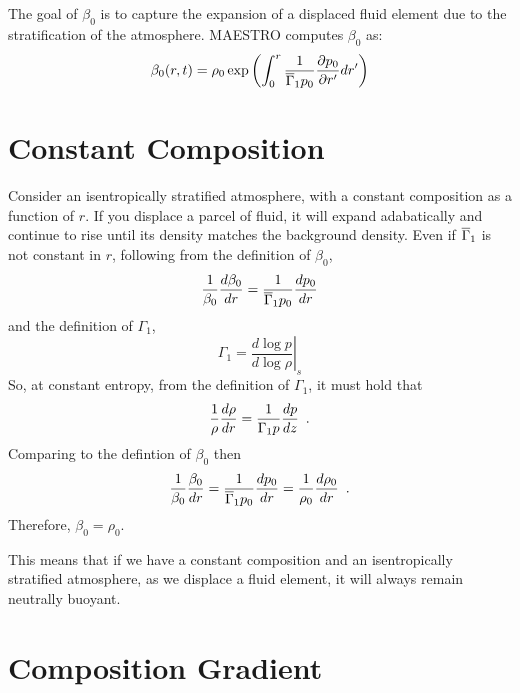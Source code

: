 The goal of $\beta_0$ is to capture the expansion of a displaced fluid
element due to the stratification of the atmosphere.  MAESTRO computes
$\beta_0$ as:
\begin{equation}
\beta_0(r,t) = \rho_0 \exp\left (  \int_0^r  \frac{1}{\overline{\Gamma}_1 p_0} \frac{\partial p_0}{\partial r^\prime} dr^\prime \right )
\end{equation}

\section{Constant Composition}
Consider an isentropically stratified atmosphere, with a constant
composition as a function of $r$.  If you displace a parcel of fluid,
it will expand adabatically and continue to rise until its density
matches the background density.  
Even if $\overline{\Gamma}_1$ is not constant in $r$, following from the
definition of $\beta_0$,
\begin{equation}
\frac{1}{\beta_0} \frac{d\beta_0}{dr} = \frac{1}{\overline{\Gamma}_1 p_0} \frac{dp_0}{dr}
\end{equation}
and the definition of $\Gamma_1$,
\begin{equation}
\Gamma_1 = \left . \frac{d \log p}{d \log \rho} \right |_s
\end{equation}
So, at constant entropy, from the definition of $\Gamma_1$, it must hold
that
\begin{equation}
\frac{1}{\rho} \frac{d \rho}{dr} = \frac{1}{\Gamma_1 p} \frac{d p}{dz} \enskip .
\end{equation}
Comparing to the defintion of $\beta_0$ then
\begin{equation}
\frac{1}{\beta_0} \frac{\beta_0}{dr} =\frac{1}{\overline{\Gamma}_1 p_0}\frac{dp_0}{dr} = \frac{1}{\rho_0} \frac{d\rho_0}{dr}  \enskip .
\end{equation}
Therefore, $\beta_0 = \rho_0$.  

This means that if we have a constant composition and an
isentropically stratified atmosphere, as we displace a fluid element,
it will always remain neutrally buoyant.



\section{Composition Gradient}

